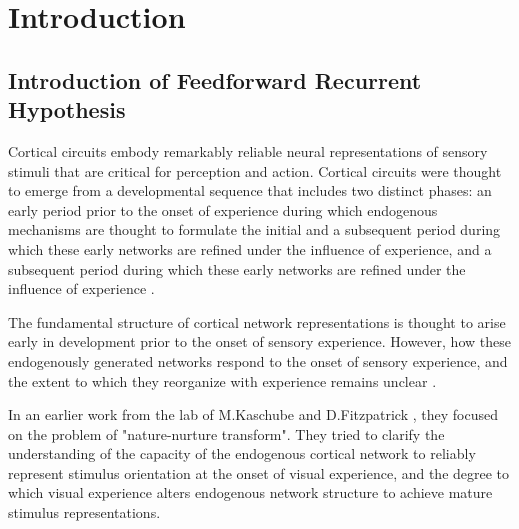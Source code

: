 \documentclass[11pt]{article}
\begin{document}
	\section{Introduction}
	\subsection{Introduction of Feedforward Recurrent Hypothesis}
	Cortical circuits embody remarkably reliable neural representations of sensory stimuli that are critical for perception and action. 
	Cortical circuits were thought to emerge from a developmental sequence that includes two distinct phases: an early period prior to the onset of experience during which endogenous mechanisms are thought to formulate the initial and a subsequent period during which these early networks are refined 
	under the influence of experience\cite{ackman2014role, feldheim2010visual, goodhill2016can, huberman2008mechanisms}, and a subsequent period during which these early networks are refined under the influence of experience \cite{avitan2018code, barlow1975visual, espinosa2012development, fregnac1984development, white2007vision}. 
	
	The fundamental structure of cortical network representations is thought to arise early in development prior to the onset of sensory experience. However, how these endogenously generated networks respond to the onset of sensory experience, and the extent to which they reorganize with experience remains unclear \cite{tragenap2023nature}. 
	
	In an earlier work from the lab of M.Kaschube and D.Fitzpatrick \cite{dayan2005theoretical}, they focused on the problem of "nature-nurture transform". They tried to clarify the understanding of the capacity of the endogenous cortical network to reliably represent stimulus orientation at the onset of visual experience, and the degree to which visual experience alters endogenous network structure to achieve mature stimulus representations.
\end{document}
